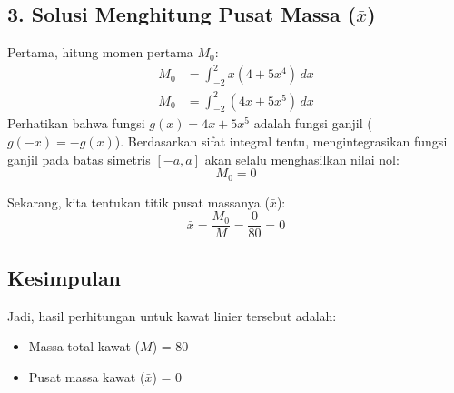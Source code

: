 \documentclass[12pt,a4paper]{article}
\begin{document}
\subsection*{3. Solusi Menghitung Pusat Massa ($\bar{x}$)}
Pertama, hitung momen pertama $M_0$:
\begin{align*}
  M_0 &= \int_{-2}^{2} x(4 + 5x^4) \, dx \\
  M_0 &= \int_{-2}^{2} (4x + 5x^5) \, dx
\end{align*}
Perhatikan bahwa fungsi $g(x) = 4x + 5x^5$ adalah fungsi ganjil ($g(-x) = -g(x)$). Berdasarkan sifat integral tentu, mengintegrasikan fungsi ganjil pada batas simetris $[-a, a]$ akan selalu menghasilkan nilai nol:
\begin{equation*}
  M_0 = 0
\end{equation*}

Sekarang, kita tentukan titik pusat massanya ($\bar{x}$):
\begin{equation*}
  \bar{x} = \frac{M_0}{M} = \frac{0}{80} = 0
\end{equation*}

\subsection*{Kesimpulan}
Jadi, hasil perhitungan untuk kawat linier tersebut adalah:
\begin{itemize}
  \item Massa total kawat ($M$) = \textbf{$80$}
  \item Pusat massa kawat ($\bar{x}$) = \textbf{$0$}
\end{itemize}
\end{document}
